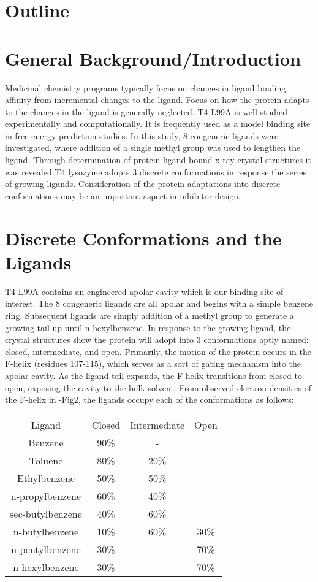 \documentclass{article}
\begin{document}
\pagebreak
\section*{Outline}
\section{General Background/Introduction}
Medicinal chemistry programs typically focus on changes in ligand binding affinity from incremental changes to the ligand.
Focus on how the protein adapts to the changes in the ligand is generally neglected.
T4 L99A is well studied experimentally and computationally. 
It is frequently used as a model binding site in free energy prediction studies.
In this study, 8 congeneric ligands were investigated, where addition of a single methyl group was used to lengthen the ligand.
Through determination of protein-ligand bound x-ray crystal structures it was revealed T4 lysozyme adopts 3 discrete conformations in response the series of growing ligands.
Consideration of the protein adaptations into discrete conformations may be an important aspect in inhibitor design.

\section{Discrete Conformations and the Ligands}
T4 L99A contains an engineered apolar cavity which is our binding site of interest.
The 8 congeneric ligands are all apolar and begins with a simple benzene ring. 
Subsequent ligands are simply addition of a methyl group to generate a growing tail up until n-hexylbenzene.
In response to the growing ligand, the crystal structures show the protein will adopt into 3 conformations aptly named: closed, intermediate, and open.
Primarily, the motion of the protein occurs in the F-helix (residues 107-115), which serves as a sort of gating mechanism into the apolar cavity.
As the ligand tail expands, the F-helix transitions from closed to open, exposing the cavity to the bulk solvent.
From observed electron densities of the F-helix in \cite{Merski2015}-Fig2, the ligands occupy each of the conformations as follows:

\begin{tabular}{|c|c|c|c|}
\hline
Ligand           & Closed & Intermediate & Open  \\
Benzene          & 90\%   & -            &       \\
Toluene          & 80\%   & 20\%         &       \\
Ethylbenzene     & 50\%   & 50\%         &       \\
n-propylbenzene  & 60\%   & 40\%         &       \\
sec-butylbenzene & 40\%   & 60\%         &       \\
n-butylbenzene   & 10\%   & 60\%         & 30\%  \\
n-pentylbenzene  & 30\%   &              & 70\%  \\
n-hexylbenzene   & 30\%   &              & 70\%  \\
\hline
\end{tabular}
\end{document}
